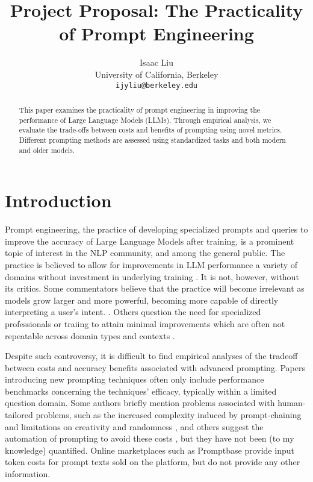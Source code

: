 \documentclass[11pt]{article}
\title{Project Proposal: The Practicality of Prompt Engineering}
\author{Isaac Liu \\
  University of California, Berkeley \\
  \texttt{ijyliu@berkeley.edu}}
\begin{document}
\maketitle
\begin{abstract}
This paper examines the practicality of prompt engineering in improving the performance of Large Language Models (LLMs). Through empirical analysis, we evaluate the trade-offs between costs and benefits of prompting using novel metrics. Different prompting methods are assessed using standardized tasks and both modern and older models.
\end{abstract}

\section*{Introduction}

Prompt engineering, the practice of developing specialized prompts and queries to improve the accuracy of Large Language Models after training, is a prominent topic of interest in the NLP community, and among the general public. The practice is believed to allow for improvements in LLM performance a variety of domains without investment in underlying training \cite{martineau_what_2021}. It is not, however, without its critics. Some commentators believe that the practice will become irrelevant as models grow larger and more powerful, becoming more capable of directly interpreting a user's intent. \cite{ethan_mollick_emollick_i_2023}. Others question the need for specialized professionals or traiing to attain minimal improvements which are often not repeatable across domain types and contexts \cite{shackell_prompt_2023, acar_ai_2023}. 

Despite such controversy, it is difficult to find empirical analyses of the tradeoff between costs and accuracy benefits associated with advanced prompting. Papers introducing new prompting techniques often only include performance benchmarks concerning the techniques' efficacy, typically within a limited question domain. Some authors briefly mention problems associated with human-tailored problems, such as the increased complexity induced by prompt-chaining and limitations on creativity and randomness \cite{wu_ai_2022}, and others suggest the automation of prompting to avoid these costs \cite{diao_active_2023}, but they have not been (to my knowledge) quantified. Online marketplaces such as Promptbase \cite{noauthor_promptbase_nodate} provide input token costs for prompt texts sold on the platform, but do not provide any other information.
\end{document}
